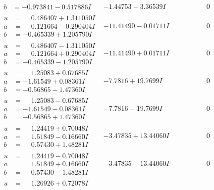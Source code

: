 \documentclass[1p]{elsarticle_modified}
\theoremstyle{definition}
\begin{document}
$$\begin{array}{c|c|c}
\begin{aligned}
b &= -0.973841 - 0.517886 I\end{aligned}
 & -1.44753 - 3.36539 I & \phantom{-0.000000 } 0 \\ \hline\begin{aligned}
u &= \phantom{-}0.486407 + 1.311050 I \\
a &= \phantom{-}0.121664 - 0.290404 I \\
b &= -0.465339 + 1.205790 I\end{aligned}
 & -11.41490 - 0.01711 I & \phantom{-0.000000 } 0 \\ \hline\begin{aligned}
u &= \phantom{-}0.486407 - 1.311050 I \\
a &= \phantom{-}0.121664 + 0.290404 I \\
b &= -0.465339 - 1.205790 I\end{aligned}
 & -11.41490 + 0.01711 I & \phantom{-0.000000 } 0 \\ \hline\begin{aligned}
u &= \phantom{-}1.25083 + 0.67685 I \\
a &= -1.61549 + 0.08361 I \\
b &= -0.56865 - 1.47360 I\end{aligned}
 & -7.7816 + 19.7699 I & \phantom{-0.000000 } 0 \\ \hline\begin{aligned}
u &= \phantom{-}1.25083 - 0.67685 I \\
a &= -1.61549 - 0.08361 I \\
b &= -0.56865 + 1.47360 I\end{aligned}
 & -7.7816 - 19.7699 I & \phantom{-0.000000 } 0 \\ \hline\begin{aligned}
u &= \phantom{-}1.24419 + 0.70048 I \\
a &= \phantom{-}1.51849 - 0.16660 I \\
b &= \phantom{-}0.57430 + 1.48281 I\end{aligned}
 & -3.47835 + 13.44060 I & \phantom{-0.000000 } 0 \\ \hline\begin{aligned}
u &= \phantom{-}1.24419 - 0.70048 I \\
a &= \phantom{-}1.51849 + 0.16660 I \\
b &= \phantom{-}0.57430 - 1.48281 I\end{aligned}
 & -3.47835 - 13.44060 I & \phantom{-0.000000 } 0 \\ \hline\begin{aligned}
u &= \phantom{-}1.26926 + 0.72078 I \\

\end{aligned}
\end{array}$$
\end{document}
